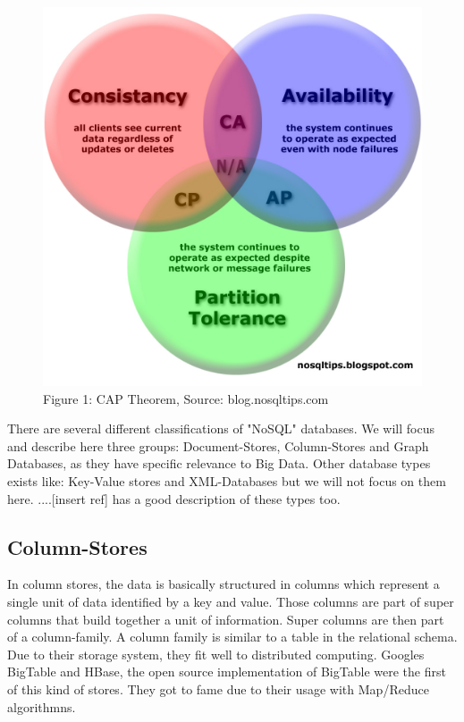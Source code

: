 \documentclass{acm_proc_article-sp}
\begin{document}
\begin{figure}[hbtp]
	\centering
	\includegraphics[scale=0.2]{CAP_Diagram_dist-copy.jpg}
	\caption{Figure 1: CAP Theorem, Source: blog.nosqltips.com}
\end{figure}

There are several different classifications of "NoSQL" databases. We will focus and describe here three groups: Document-Stores, Column-Stores and Graph Databases, as they have specific relevance to Big Data. Other database types exists like: Key-Value stores and XML-Databases but we will not focus on them here. ....[insert ref] has a good description of these types too.


	
	
\subsection{Column-Stores}

In column stores, the data is basically structured in columns which represent a single
unit of data identified by a key and value. Those columns are part of super columns that
build together a unit of information. Super columns are then part of a column-family.
A column family is similar to a table in the relational schema. Due to their storage system, they fit well to distributed computing. Googles BigTable and HBase, the open source implementation of BigTable were the first of this kind of stores. They got to fame due to their usage with Map/Reduce algorithmns. 
\end{document}
